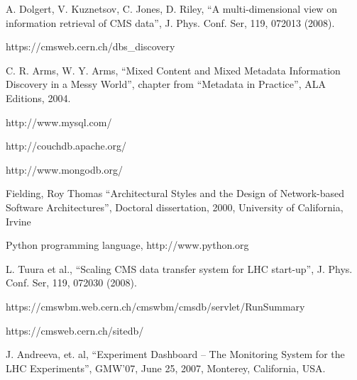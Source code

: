 \documentclass[1p,times]{elsarticle}
\begin{document}
\begin{thebibliography}{00}
A. Dolgert, V. Kuznetsov, C. Jones, D. Riley, 
``A multi-dimensional view on information retrieval of CMS data'',
J. Phys. Conf. Ser, 119, 072013 (2008).

 https://cmsweb.cern.ch/dbs\_discovery

C. R. Arms, W. Y. Arms,
 ``Mixed Content and Mixed Metadata 
Information Discovery in a Messy World'',
chapter from ``Metadata in Practice'', ALA Editions, 2004.

http://www.mysql.com/

http://couchdb.apache.org/

http://www.mongodb.org/

Fielding, Roy Thomas ``Architectural Styles and the Design of 
Network-based Software Architectures'', Doctoral dissertation, 2000,
University of California, Irvine

 Python programming language, http://www.python.org

L. Tuura et al., 
``Scaling CMS data transfer system for LHC start-up'', 
J. Phys. Conf. Ser, 119, 072030 (2008).

https://cmswbm.web.cern.ch/cmswbm/cmsdb/servlet/RunSummary

https://cmsweb.cern.ch/sitedb/




J. Andreeva, et. al,
``Experiment Dashboard – The Monitoring System for the LHC Experiments'',
GMW’07, June 25, 2007, Monterey, California, USA.


\end{thebibliography}
\end{document}
